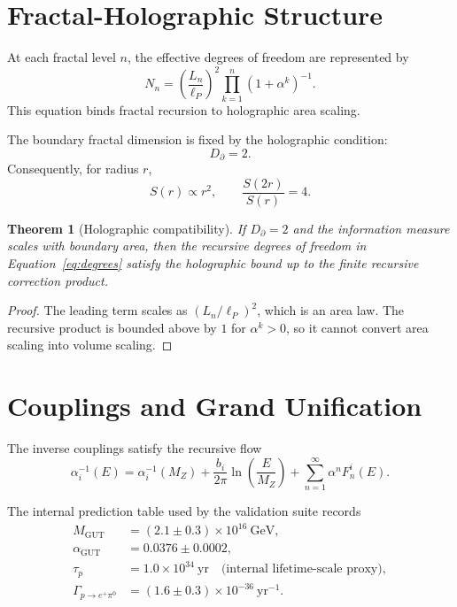 \documentclass[12pt]{article}
\newtheorem{theorem}{Theorem}[section]
\theoremstyle{remark}
\newcommand{\MGUT}{M_{\mathrm{GUT}}}
\newcommand{\aGUT}{\alpha_{\mathrm{GUT}}}
\begin{document}
\section{Fractal-Holographic Structure}

At each fractal level $n$, the effective degrees of freedom are represented by
\begin{equation}
  N_n =
  \left(\frac{L_n}{\ell_P}\right)^2
  \prod_{k=1}^{n}(1+\alpha^k)^{-1}.
  \label{eq:degrees}
\end{equation}
This equation binds fractal recursion to holographic area scaling.

The boundary fractal dimension is fixed by the holographic condition:
\begin{equation}
  D_{\partial}=2.
\end{equation}
Consequently, for radius $r$,
\begin{equation}
  S(r)\propto r^2,
  \qquad
  \frac{S(2r)}{S(r)}=4.
\end{equation}

\begin{theorem}[Holographic compatibility]
If $D_{\partial}=2$ and the information measure scales with boundary area,
then the recursive degrees of freedom in Equation~\eqref{eq:degrees} satisfy
the holographic bound up to the finite recursive correction product.
\end{theorem}

\begin{proof}
The leading term scales as $(L_n/\ell_P)^2$, which is an area law.  The
recursive product is bounded above by $1$ for $\alpha^k>0$, so it cannot convert
area scaling into volume scaling.
\end{proof}

\section{Couplings and Grand Unification}

The inverse couplings satisfy the recursive flow
\begin{equation}
  \alpha_i^{-1}(E)
  =
  \alpha_i^{-1}(M_Z)
  +\frac{b_i}{2\pi}\ln\!\left(\frac{E}{M_Z}\right)
  +\sum_{n=1}^{\infty}\alpha^n F_n^i(E).
  \label{eq:rg}
\end{equation}

The internal prediction table used by the validation suite records
\begin{align}
  \MGUT &= (2.1\pm0.3)\times10^{16}\ \mathrm{GeV},\\
  \aGUT &= 0.0376\pm0.0002,\\
  \tau_p &= 1.0\times10^{34}\ \mathrm{yr}
  \quad\text{(internal lifetime-scale proxy)},\\
  \Gamma_{p\to e^+\pi^0}
  &= (1.6\pm0.3)\times10^{-36}\ \mathrm{yr}^{-1}.
\end{align}
\end{document}
